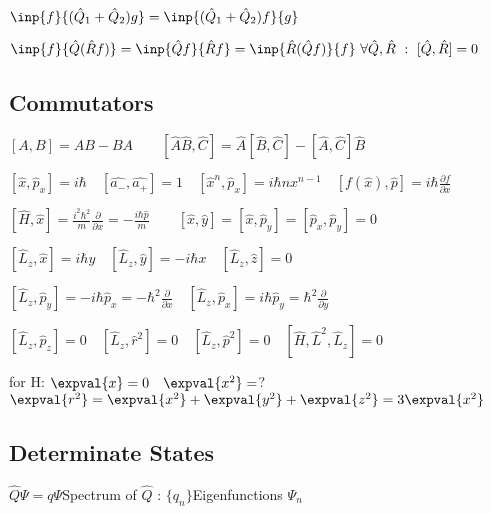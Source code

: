 \documentclass[10pt,a4paper]{scrartcl}
\begin{document}
\begin{multicols*}{3}
	\begin{center}
	
	\end{center}
	
	$\inp{f}{(\hat{Q}_1+\hat{Q}_2)g}=\inp{(\hat{Q}_1+\hat{Q}_2)f}{g}$
	
	$\inp{f}{\hat{Q}(\hat{R}f)}=\inp{\hat{Q}f}{\hat{R}f}=\inp{\hat{R}(\hat{Q}f)}{f}\ \forall \hat{Q},\hat{R}\ :\ [\hat{Q},\hat{R}]=0 $
	
	\subsection{Commutators}
	
	$[A,B]=AB-BA\qquad [\hat{A}\hat{B},\hat{C}]=\hat{A}[\hat{B},\hat{C}]-[\hat{A},\hat{C}]\hat{B}$

	\small

	$[\hat{x},\hat{p}_x]=i\hbar\quad[\hat{a_-},\hat{a_+}]=1\quad[\hat{x}^n,\hat{p}_x]=i\hbar nx^{n-1}\quad[f(\hat{x}),\hat{p}]=i\hbar \frac{\partial f}{\partial x}$

	\normalsize
	
	$[\hat{H},\hat{x}]=\frac{i^2\hbar^2}{m}\frac{\partial}{\partial x}=-\frac{i\hbar \hat{p}}{m}\qquad [\hat{x},\hat{y}]=[\hat{x},\hat{p}_y]=[\hat{p}_x,\hat{p}_y]=0$
	
	$[\hat{L}_z,\hat{x}]=i\hbar y\quad[\hat{L}_z,\hat{y}]=-i\hbar x\quad[\hat{L}_z,\hat{z}]=0$
	
	$[\hat{L}_z,\hat{p}_y]=-i\hbar \hat{p}_x=-\hbar^2 \frac{\partial}{\partial x}\quad [\hat{L}_z,\hat{p}_x]=i\hbar \hat{p}_y=\hbar^2\frac{\partial}{\partial y}$
	
	$[\hat{L}_z,\hat{p}_z]=0\quad[\hat{L}_z,\hat{r}^2]=0\quad[\hat{L}_z,\hat{p}^2]=0\quad[\hat{H},\hat{L}^2,\hat{L}_z]=0$
	
	for H: $\expval{x}=0\quad \expval{x^2}=$?\dahe$\expval{r^2}=\expval{x^2}+\expval{y^2}+\expval{z^2}=3\expval{x^2}$
		
	\subsection{Determinate States}
	
	$\hat{Q}\Psi=q\Psi$\hfill Spectrum of $\hat{Q}$ : $\{q_n\}$\hfill Eigenfunctions $\Psi_n$
	
	

\end{multicols*}
\end{document}

